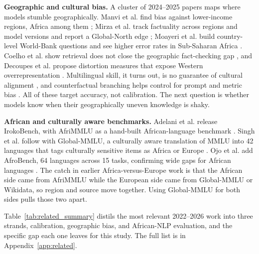 \documentclass[11pt]{article}
\begin{document}
\textbf{Geographic and cultural bias.} A cluster of 2024--2025 papers maps where models stumble geographically. Manvi et al. find bias against lower-income regions, Africa among them \cite{manvi2024geographically}; Mirza et al. track factuality across regions and model versions and report a Global-North edge \cite{mirza2024global}; Moayeri et al. build country-level World-Bank questions and see higher error rates in Sub-Saharan Africa \cite{moayeri2024worldbench}. Coelho et al. show retrieval does not close the geographic fact-checking gap \cite{coelho2025inequality}, and Decoupes et al. propose distortion measures that expose Western overrepresentation \cite{decoupes2025geographical}. Multilingual skill, it turns out, is no guarantee of cultural alignment \cite{rystrom2025multilingual}, and counterfactual branching helps control for prompt and metric bias \cite{guan2025saged}. All of these target accuracy, not calibration. The next question is whether models know when their geographically uneven knowledge is shaky.

\textbf{African and culturally aware benchmarks.} Adelani et al. release IrokoBench, with AfriMMLU as a hand-built African-language benchmark \cite{adelani2025irokobench}. Singh et al. follow with Global-MMLU, a culturally aware translation of MMLU into 42 languages that tags culturally sensitive items as Africa or Europe \cite{singh2025global}. Ojo et al. add AfroBench, 64 languages across 15 tasks, confirming wide gaps for African languages \cite{ojo2025afrobench}. The catch in earlier Africa-versus-Europe work is that the African side came from AfriMMLU while the European side came from Global-MMLU or Wikidata, so region and source move together. Using Global-MMLU for both sides pulls those two apart.

Table~\ref{tab:related_summary} distils the most relevant 2022--2026 work into three strands, calibration, geographic bias, and African-NLP evaluation, and the specific gap each one leaves for this study. The full list is in Appendix~\ref{app:related}.
\end{document}
